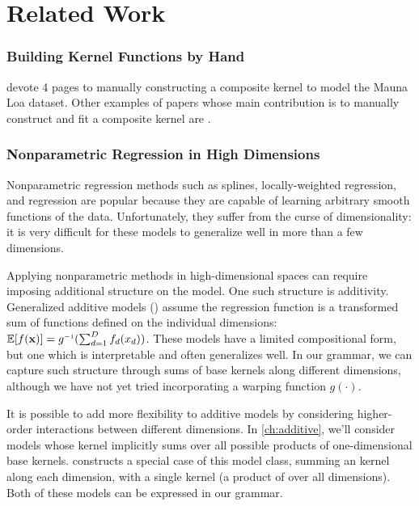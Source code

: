 




\section{Related Work}
\label{sec:gpss-related-work}

\def\rwsheader{\subsubsection}

\rwsheader{Building Kernel Functions by Hand}
\citet[Chapter 5]{rasmussen38gaussian} devote 4 pages to manually constructing a composite kernel to model the Mauna Loa dataset.
Other examples of papers whose main contribution is to manually construct and fit a composite \gp{} kernel are \citep{EdgarTelescope,lloydgefcom2012,textperiodic13}.


\rwsheader{Nonparametric Regression in High Dimensions}
Nonparametric regression methods such as splines, locally-weighted regression, and \gp{} regression are popular because they are capable of learning arbitrary smooth functions of the data.
Unfortunately, they suffer from the curse of dimensionality: it is very difficult for these models to generalize well in more than a few dimensions.

Applying nonparametric methods in high-dimensional spaces can require imposing additional structure on the model.
One such structure is additivity.
Generalized additive models (\GAM{}) assume the regression function is a transformed sum of functions defined on the individual dimensions: $\expect[f(\vx)] = g\inv(\sum_{d=1}^D f_d(x_d))$.
These models have a limited compositional form, but one which is interpretable and often generalizes well.
In our grammar, we can capture such structure through sums of base kernels along different dimensions, although we have not yet tried incorporating a warping function $g(\cdot)$.

It is possible to add more flexibility to additive models by considering higher-order interactions between different dimensions. 
In \cref{ch:additive}, we'll consider \gp{} models whose kernel implicitly sums over all possible products of one-dimensional base kernels.
\citet{plate1999accuracy} constructs a special case of this model class, summing an \kSE{} kernel along each dimension, with a single \seard{} kernel (a product of \kSE{} over all dimensions).
Both of these models can be expressed in our grammar.

